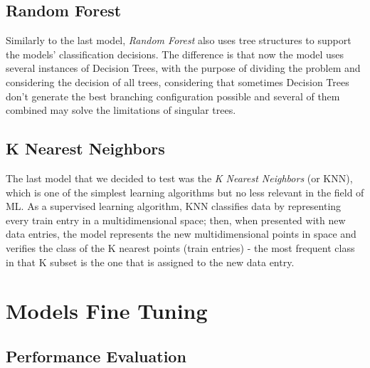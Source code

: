 \documentclass[extendedabs]{recpad2k}
\begin{document}
\subsection{Random Forest}

Similarly to the last model, \textit{Random Forest} also uses tree structures to support the models' classification decisions. 
The difference is that now the model uses several instances of Decision Trees, with the purpose of dividing the problem and considering the decision of all 
trees, considering that sometimes Decision Trees don't generate the best branching configuration possible and several of them combined may solve the limitations 
of singular trees.

\subsection{K Nearest Neighbors}

The last model that we decided to test was the \textit{K Nearest Neighbors} (or KNN), which is one of the simplest learning algorithms but no less relevant 
in the field of ML. 
As a supervised learning algorithm, KNN classifies data by representing every train entry in a multidimensional space; then, when presented with new data entries, 
the model represents the new multidimensional points in space and verifies the class of the K nearest points (train entries) - the most frequent class in that K 
subset is the one that is assigned to the new data entry. 

\section{Models Fine Tuning}\label{parameters} %

\subsection{Performance Evaluation}
\end{document}
